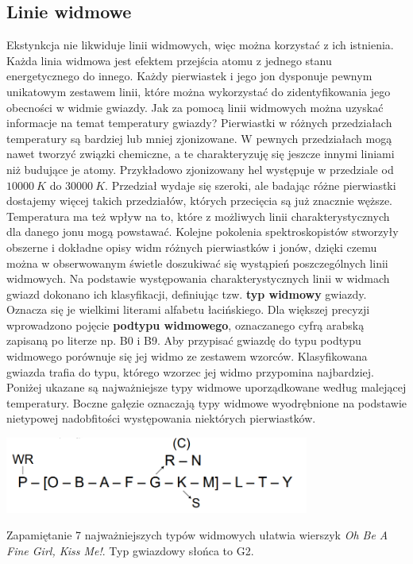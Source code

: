 \documentclass[../index.tex]{subfiles}
\begin{document}
        \subsection{Linie widmowe}
            Ekstynkcja nie likwiduje linii widmowych, więc można korzystać z ich istnienia. Każda linia widmowa jest efektem przejścia atomu z jednego stanu energetycznego do innego. Każdy pierwiastek i jego jon dysponuje pewnym unikatowym zestawem linii, które można wykorzystać do zidentyfikowania jego obecności w widmie gwiazdy. Jak za pomocą linii widmowych można uzyskać informacje na temat temperatury gwiazdy? Pierwiastki w różnych przedziałach temperatury są bardziej lub mniej zjonizowane. W pewnych przedziałach mogą nawet tworzyć związki chemiczne, a te charakteryzuję się jeszcze innymi liniami niż budujące je atomy. Przykładowo zjonizowany hel występuje w przedziale od \(10000\:K\) do \(30000\:K\). Przedział wydaje się szeroki, ale badając różne pierwiastki dostajemy więcej takich przedziałów, których przecięcia są już znacznie węższe. Temperatura ma też wpływ na to, które z możliwych linii charakterystycznych dla danego jonu mogą powstawać. Kolejne pokolenia spektroskopistów stworzyły obszerne i dokładne opisy widm różnych pierwiastków i jonów, dzięki czemu można w obserwowanym świetle doszukiwać się wystąpień poszczególnych linii widmowych.\newline
            Na podstawie występowania charakterystycznych linii w widmach
            gwiazd dokonano ich klasyfikacji, definiując tzw. \textbf{typ widmowy} gwiazdy. Oznacza się je wielkimi literami alfabetu łacińskiego. Dla większej precyzji wprowadzono pojęcie \textbf{podtypu widmowego}, oznaczanego cyfrą arabską zapisaną po literze np. B0 i B9. Aby przypisać gwiazdę do typu podtypu widmowego porównuje się jej widmo ze zestawem wzorców. Klasyfikowana gwiazda trafia do typu, którego wzorzec jej widmo przypomina najbardziej. Poniżej ukazane są najważniejsze typy widmowe uporządkowane według malejącej temperatury. Boczne gałęzie oznaczają typy widmowe wyodrębnione na podstawie nietypowej nadobfitości występowania niektórych pierwiastków.
            \begin{center}
                \includegraphics[width=10cm]{images/typyWidmowe.png}
            \end{center}
            Zapamiętanie 7 najważniejszych typów widmowych ułatwia wierszyk \textit{Oh Be A Fine Girl, Kiss Me!}. Typ gwiazdowy słońca to G2.
\end{document}
